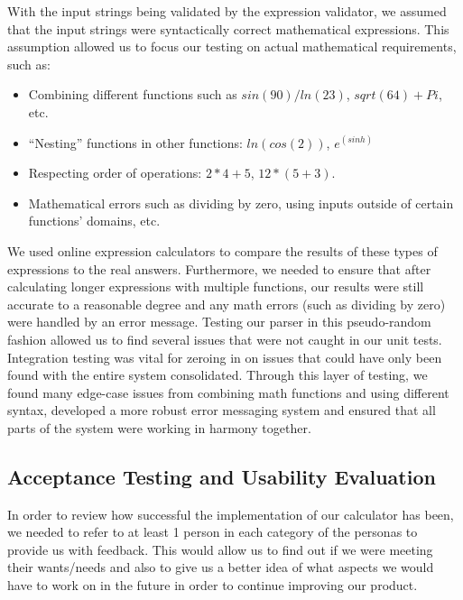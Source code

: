 \documentclass[a4paper, 12pt]{article}
\begin{document}
With the input strings being validated by the expression validator, we assumed that the input strings were syntactically correct mathematical expressions. This assumption allowed us to focus our testing on actual mathematical requirements, such as:
\\

\begin{itemize}[noitemsep,topsep=0pt,parsep=0pt,partopsep=0pt]
\item Combining different functions such as $sin(90)/ln(23)$, $sqrt(64)+Pi$, etc.
\item “Nesting” functions in other functions: $ln(cos(2))$, $e^(sinh)$
\item Respecting order of operations: $2*4+5$, $12 * ( 5 + 3 )$.
\item Mathematical errors such as dividing by zero, using inputs outside of certain functions’ domains, etc. 
\end{itemize}

\vspace{5mm}

We used online expression calculators to compare the results of these types of expressions to the real answers.  Furthermore, we needed to ensure that after calculating longer expressions with multiple functions, our results were still accurate to a reasonable degree and any math errors (such as dividing by zero) were handled by an error message. Testing our parser in this pseudo-random fashion allowed us to find several issues that were not caught in our unit tests.
\\

Integration testing was vital for zeroing in on issues that could have only been found with the entire system consolidated. Through this layer of testing, we found many edge-case issues from combining math functions and using different syntax, developed a more robust error messaging system and ensured that all parts of the system were working in harmony together.


\subsection{Acceptance Testing and Usability Evaluation}

In order to review how successful the implementation of our calculator has been, we needed to refer to at least 1 person in each category of the personas to provide us with feedback. This would allow us to find out if we were meeting their wants/needs and also to give us a better idea of what aspects we would have to work on in the future in order to continue improving our product.
\\
\end{document}
